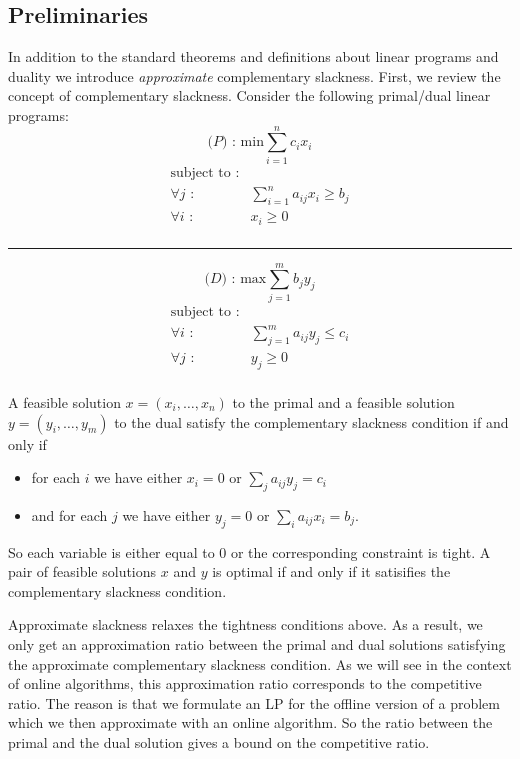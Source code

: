 \subsection{Preliminaries}
In addition to the standard theorems and definitions about linear programs and duality we introduce \emph{approximate} complementary slackness.
First, we review the concept of complementary slackness.
Consider the following primal/dual linear programs:
\[
\textrm{($P$) : min}  \sum^n_{i=1} c_i x_i
\]
\[
	\begin{array}{lr}
	\textrm{subject to :} & \\
	\forall j \textrm{ :} & \sum_{i=1}^n a_{ij} x_i \geq b_j \\
	\forall i \textrm{ :} & x_i \geq 0 \\
	\end{array}
\]

\vspace{0.1cm}
\hrule
\vspace{0.1cm}

\[
\textrm{($D$) : max}  \sum^m_{j=1} b_j y_j
\]
\[
	\begin{array}{lr}
	\textrm{subject to :} & \\	
	\forall i \textrm{ :} & \sum_{j=1}^m a_{ij} y_j \leq c_i \\
	\forall j \textrm{ :} & y_j \geq 0 \\
	\end{array}
\]

A feasible solution $x = (x_i, \ldots, x_n)$ to the primal and a feasible solution $y = (y_i, \ldots, y_m)$ to the dual satisfy the complementary slackness condition if and only if
\begin{itemize}
\item for each $i$ we have either $x_i = 0$ or $\sum_{j} a_{ij}y_j = c_i$
\item and for each $j$ we have either $y_j = 0$ or $\sum_{i} a_{ij} x_i = b_j$.
\end{itemize}
So each variable is either equal to 0 or the corresponding constraint is tight.
A pair of feasible solutions $x$ and $y$ is optimal if and only if it satisifies the complementary slackness condition.

Approximate slackness relaxes the tightness conditions above.
As a result, we only get an approximation ratio between the primal and dual solutions satisfying the approximate complementary slackness condition.
As we will see in the context of online algorithms, this approximation ratio corresponds to the competitive ratio.
The reason is that we formulate an LP for the offline version of a problem which we then approximate with an online algorithm.
So the ratio between the primal and the dual solution gives a bound on the competitive ratio.

